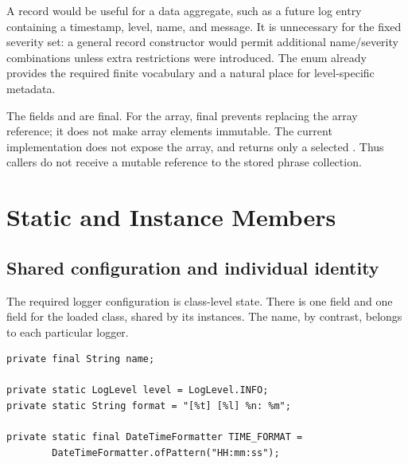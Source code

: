 A record would be useful for a data aggregate, such as a future log entry containing a timestamp, level, name, and message. It is unnecessary for the fixed severity set: a general record constructor would permit additional name/severity combinations unless extra restrictions were introduced. The enum already provides the required finite vocabulary and a natural place for level-specific metadata.

The fields  and  are final. For the array, final prevents replacing the array reference; it does not make array elements immutable. The current implementation does not expose the array, and  returns only a selected . Thus callers do not receive a mutable reference to the stored phrase collection.

\section{Static and Instance Members}
\subsection{Shared configuration and individual identity}
The required logger configuration is class-level state. There is one  field and one  field for the loaded  class, shared by its instances. The name, by contrast, belongs to each particular logger.

\begin{samepage}
\begin{lstlisting}
private final String name;

private static LogLevel level = LogLevel.INFO;
private static String format = "[%t] [%l] %n: %m";

private static final DateTimeFormatter TIME_FORMAT =
        DateTimeFormatter.ofPattern("HH:mm:ss");
\end{lstlisting}
\end{samepage}

